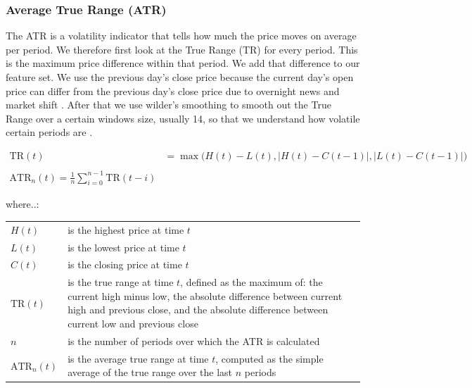 \documentclass[a4paper,12pt]{report}
\begin{document}
			\subsubsection{Average True Range (ATR)}
			
			The ATR is a volatility indicator that tells how much the price moves on average per period. We therefore first look at the True Range (TR) for every period. This is the maximum price difference within that period. We add that difference to our feature set. We use the previous day’s close price because the current day’s open price can differ from the previous day’s close price due to overnight news and market shift \cite{30}. After that we use wilder’s smoothing to smooth out the True Range over a certain windows size, usually 14, so that we understand how volatile certain periods are \cite{31}. 
			
			
\[
\begin{aligned}
  \text{TR}(t) &= \max \big( H(t) - L(t), |H(t) - C(t-1)|, |L(t) - C(t-1)| \big) \\\\
  \text{ATR}_n(t) = \frac{1}{n} \sum_{i=0}^{n-1} \text{TR}(t - i)
\end{aligned}
\]

\begin{minipage}{\textwidth}

where..:\\

\begin{tabularx}{\textwidth}{@{}l@{\hspace{2em}--\hspace{2em}}X@{}}
  $H(t)$       & is the highest price at time $t$ \\
  $L(t)$       & is the lowest price at time $t$ \\
  $C(t)$       & is the closing price at time $t$ \\
  $\text{TR}(t)$ & is the true range at time $t$, defined as the maximum of: the current high minus low, the absolute difference between current high and previous close, and the absolute difference between current low and previous close \\
  $n$          & is the number of periods over which the ATR is calculated \\
  $\text{ATR}_n(t)$ & is the average true range at time $t$, computed as the simple average of the true range over the last $n$ periods \\
\end{tabularx}
\end{minipage}
\end{document}
